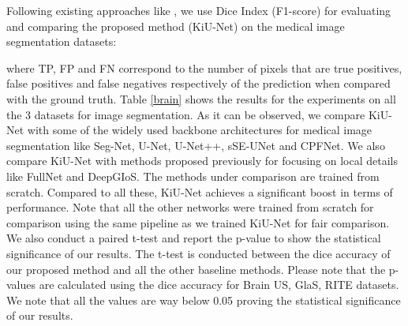 \documentclass[journal,twoside,web]{ieeecolor}
\begin{document}
Following existing approaches like \cite{zhou2019unet++}, we use Dice Index (F1-score) for evaluating and comparing the proposed method (KiU-Net) on the medical image segmentation datasets:

where TP, FP and FN correspond to the number of pixels that are true positives, false positives and false negatives respectively of the prediction when compared with the ground truth. Table \ref{brain} shows  the results for the experiments on all the 3 datasets for image segmentation. As it can be observed, we compare KiU-Net with some of the widely used backbone architectures for medical image segmentation  like Seg-Net, U-Net, U-Net++, sSE-UNet and CPFNet. We also compare KiU-Net with methods proposed previously for focusing on local details like FullNet and DeepGIoS. The methods under comparison are trained from scratch. Compared to all these, KiU-Net achieves a significant boost in terms of performance. Note that all the other networks were trained from scratch for comparison using the same pipeline as we trained KiU-Net for fair comparison. We also conduct a paired t-test and report the p-value to show the statistical significance of our results. The t-test is conducted between the dice accuracy of our proposed method and all the other baseline methods. Please note that
the p-values are calculated using the dice accuracy for Brain US, GlaS, RITE datasets. We note that all the values are way below 0.05 proving the statistical significance of our results.
\end{document}
